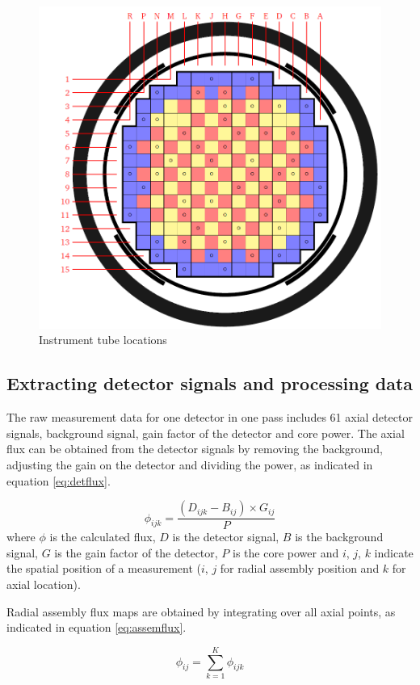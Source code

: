 \documentclass{article}
\begin{document}
\begin{figure}[ht]
\centering
\includegraphics[keepaspectratio, width = 4.0 in]{figures/intrs_pos.png}
\caption{Instrument tube locations}
\label{fig:fig_instr_pos}
\end{figure}


\subsection{Extracting detector signals and processing data}

The raw measurement data for one detector in one pass includes 61 axial detector signals, background signal, gain factor of the detector and core power. The axial flux can be obtained from the detector signals by removing the background, adjusting the gain on the detector and dividing the power, as indicated in equation \ref{eq:detflux}.

\begin{equation}
\label{eq:detflux}
  \phi_{ijk} = \frac{(D_{ijk}-B_{ij})\times G_{ij}}{P}
\end{equation}
where $\phi$ is the calculated flux, $D$ is the detector signal, $B$ is the background signal, $G$ is the gain factor of the detector, $P$ is the core power and $i$, $j$, $k$ indicate the spatial position of a measurement ($i$, $j$ for radial assembly position and $k$ for axial location).

Radial assembly flux maps are obtained by integrating over all axial points, as indicated in equation \ref{eq:assemflux}.

\begin{equation}
\label{eq:assemflux}
  \phi_{ij} = \sum_{k=1}^{K} \phi_{ijk}
\end{equation}
\end{document}

